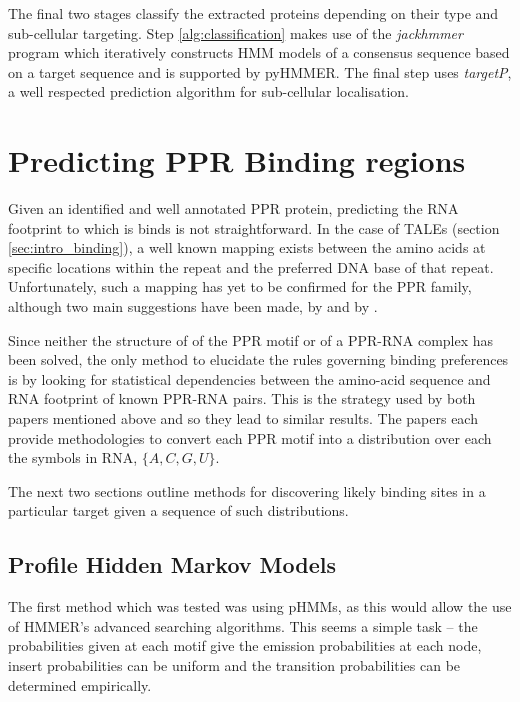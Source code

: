 The final two stages classify the extracted proteins depending on their type
and sub-cellular targeting.
Step \ref{alg:classification} makes use of the \emph{jackhmmer} program which
iteratively constructs HMM models of a consensus sequence based on a target
sequence and is supported by pyHMMER.
The final step uses \emph{targetP}, a well respected prediction algorithm for
sub-cellular localisation\citep{targetP}.

\section{Predicting PPR Binding regions}
\label{sec:ppr_binding_prediction}

Given an identified and well annotated PPR protein, predicting the RNA 
footprint to which is binds is not straightforward.
In the case of TALEs (section \ref{sec:intro_binding}), a well known mapping
exists between the amino acids at specific locations within the repeat and the
preferred DNA base of that repeat.
Unfortunately, such a mapping has yet to be confirmed for the PPR family,
although two main suggestions have been made, by \citet{Barkan2012} and by
\citet{Yagi2013}.

Since neither the structure of of the PPR motif or of a PPR-RNA complex
has been solved, the only method to elucidate the rules governing binding
preferences is by looking for statistical dependencies between the amino-acid
sequence and RNA footprint of known PPR-RNA pairs.
This is the strategy used by both papers mentioned above and so they lead to
similar results.
The papers each provide methodologies to convert each PPR motif into a
distribution over each the symbols in RNA, $\{A,C,G,U\}$.

The next two sections outline methods for discovering likely binding sites
in a particular target given a sequence of such distributions.

\subsection{Profile Hidden Markov Models}
\label{sec:hmm_binding}

The first method which was tested was using pHMMs, as this would allow the use
of HMMER's advanced searching algorithms.
This seems a simple task -- the probabilities given at each motif give the
emission probabilities at each node, insert probabilities can be uniform and
the transition probabilities can be determined empirically.

